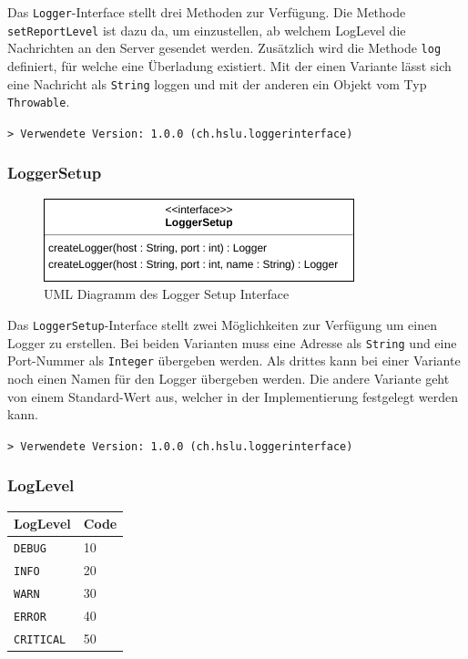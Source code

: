 \documentclass[12pt,a4paper,twosided]{scrartcl}
\begin{document}
Das \texttt{Logger}-Interface stellt drei Methoden zur Verfügung. Die Methode \texttt{setReportLevel} ist dazu da, um einzustellen, ab welchem LogLevel die Nachrichten an den Server gesendet werden. Zusätzlich wird die Methode \texttt{log} definiert, für welche eine Überladung existiert. Mit der einen Variante lässt sich eine Nachricht als \texttt{String} loggen und mit der anderen ein Objekt vom Typ \texttt{Throwable}.

\texttt{> Verwendete Version: 1.0.0 (ch.hslu.loggerinterface)}

\subsubsection{LoggerSetup}
\begin{figure}[h]
	\centering
	\includegraphics[width=0.5\linewidth]{img/LoggerSetup}
	\caption{UML Diagramm des Logger Setup Interface}
	\label{fig:loggersetup}
\end{figure}

Das \texttt{LoggerSetup}-Interface stellt zwei Möglichkeiten zur Verfügung um einen Logger zu erstellen. Bei beiden Varianten muss eine Adresse als \texttt{String} und eine Port-Nummer als \texttt{Integer} übergeben werden. Als drittes kann bei einer Variante noch einen Namen für den Logger übergeben werden. Die andere Variante geht von einem Standard-Wert aus, welcher in der Implementierung festgelegt werden kann.

\texttt{> Verwendete Version: 1.0.0 (ch.hslu.loggerinterface)}

\subsubsection{LogLevel}
\begin{tabular}{|l|l|}
	\hline \textbf{LogLevel} & \textbf{Code} \\ \hline
	\texttt{DEBUG} & 10 \\ \hline
	\texttt{INFO} & 20 \\ \hline
	\texttt{WARN} & 30 \\ \hline
	\texttt{ERROR} & 40 \\ \hline
	\texttt{CRITICAL} & 50 \\ \hline
\end{tabular}
\end{document}
